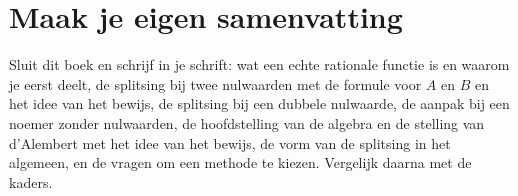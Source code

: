 \begin{oefeningen}



\end{oefeningen}


\begin{oefeningen}







\end{oefeningen}


\ifzelfstudie
\section*{Maak je eigen samenvatting}
Sluit dit boek en schrijf in je schrift: wat een echte rationale functie is en waarom je eerst deelt, de splitsing bij twee nulwaarden met de formule voor $A$ en $B$ en het idee van het bewijs, de splitsing bij een dubbele nulwaarde, de aanpak bij een noemer zonder nulwaarden, de hoofdstelling van de algebra en de stelling van d'Alembert met het idee van het bewijs, de vorm van de splitsing in het algemeen, en de vragen om een methode te kiezen. Vergelijk daarna met de kaders.
\fi
